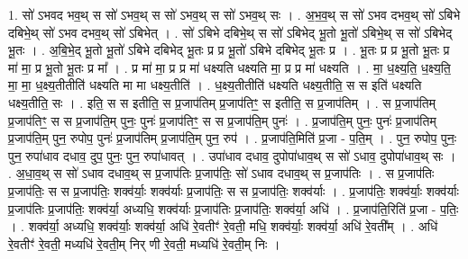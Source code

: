 \documentclass[17pt]{extarticle}
\begin{document}
1. सो॑ ऽभवद भव॒थ् स सो॑ ऽभव॒थ् स सो॑ ऽभव॒थ् स सो॑ ऽभव॒थ् सः । . अ॒भ॒व॒थ् स सो॑ ऽभव दभव॒थ् सो॑ ऽबिभे दबिभे॒थ् सो॑ ऽभव दभव॒थ् सो॑ ऽबिभेत् । . सो॑ ऽबिभे दबिभे॒थ् स सो॑ ऽबिभेद् भू॒तो भू॒तो॑ ऽबिभे॒थ् स सो॑ ऽबिभेद् भू॒तः । . अ॒बि॒भे॒द् भू॒तो भू॒तो॑ ऽबिभे दबिभेद् भू॒तः प्र प्र भू॒तो॑ ऽबिभे दबिभेद् भू॒तः प्र । . भू॒तः प्र प्र भू॒तो भू॒तः प्र मा॑ मा॒ प्र भू॒तो भू॒तः प्र मा᳚ । . प्र मा॑ मा॒ प्र प्र मा॑ धक्ष्यति धक्ष्यति मा॒ प्र प्र मा॑ धक्ष्यति । . मा॒ ध॒क्ष्य॒ति॒ ध॒क्ष्य॒ति॒ मा॒ मा॒ ध॒क्ष्य॒तीतीति॑ धक्ष्यति मा मा धक्ष्य॒तीति॑ । . ध॒क्ष्य॒तीतीति॑ धक्ष्यति धक्ष्य॒तीति॒ स स इति॑ धक्ष्यति धक्ष्य॒तीति॒ सः । . इति॒ स स इतीति॒ स प्र॒जाप॑तिम् प्र॒जाप॑तिꣳ॒॒ स इतीति॒ स प्र॒जाप॑तिम् । . स प्र॒जाप॑तिम् प्र॒जाप॑तिꣳ॒॒ स स प्र॒जाप॑ति॒म् पुनः॒ पुनः॑ प्र॒जाप॑तिꣳ॒॒ स स प्र॒जाप॑ति॒म् पुनः॑ । . प्र॒जाप॑ति॒म् पुनः॒ पुनः॑ प्र॒जाप॑तिम् प्र॒जाप॑ति॒म् पुन॒ रुपोप॒ पुनः॑ प्र॒जाप॑तिम् प्र॒जाप॑ति॒म् पुन॒ रुप॑ । . प्र॒जाप॑ति॒मिति॑ प्र॒जा - प॒ति॒म् । . पुन॒ रुपोप॒ पुनः॒ पुन॒ रुपा॑धाव दधाव॒ दुप॒ पुनः॒ पुन॒ रुपा॑धावत् । . उपा॑धाव दधाव॒ दुपोपा॑धाव॒थ् स सो॑ ऽधाव॒ दुपोपा॑धाव॒थ् सः । . अ॒धा॒व॒थ् स सो॑ ऽधाव दधाव॒थ् स प्र॒जाप॑तिः प्र॒जाप॑तिः॒ सो॑ ऽधाव दधाव॒थ् स प्र॒जाप॑तिः । . स प्र॒जाप॑तिः प्र॒जाप॑तिः॒ स स प्र॒जाप॑तिः॒ शक्व॑र्याः॒ शक्व॑र्याः प्र॒जाप॑तिः॒ स स प्र॒जाप॑तिः॒ शक्व॑र्याः । . प्र॒जाप॑तिः॒ शक्व॑र्याः॒ शक्व॑र्याः प्र॒जाप॑तिः प्र॒जाप॑तिः॒ शक्व॑र्या॒ अध्यधि॒ शक्व॑र्याः प्र॒जाप॑तिः प्र॒जाप॑तिः॒ शक्व॑र्या॒ अधि॑ । . प्र॒जाप॑ति॒रिति॑ प्र॒जा - प॒तिः॒ । . शक्व॑र्या॒ अध्यधि॒ शक्व॑र्याः॒ शक्व॑र्या॒ अधि॑ रे॒वतीꣳ॑ रे॒वती॒ मधि॒ शक्व॑र्याः॒ शक्व॑र्या॒ अधि॑ रे॒वती᳚म् । . अधि॑ रे॒वतीꣳ॑ रे॒वती॒ मध्यधि॑ रे॒वती॒म् निर् णी रे॒वती॒ मध्यधि॑ रे॒वती॒म् निः । \newline
\end{document}
